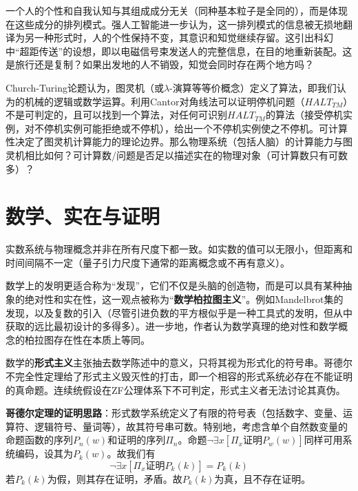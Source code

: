 \par 一个人的个性和自我认知与其组成成分无关（同种基本粒子是全同的），而是体现在这些成分的排列模式。强人工智能进一步认为，这一排列模式的信息被无损地翻译为另一种形式时，人的个性保持不变，其意识和知觉继续存留。这引出科幻中“超距传送”的设想，即以电磁信号束发送人的完整信息，在目的地重新装配。这是旅行还是复制？如果出发地的人不销毁，知觉会同时存在两个地方吗？

\par Church-Turing论题认为，图灵机（或$\lambda$-演算等等价概念）定义了算法，即我们认为的机械的逻辑或数学运算。利用Cantor对角线法可以证明停机问题（$HALT_{TM}$）不是可判定的，且可以找到一个算法，对任何可识别$HALT_{TM}$的算法（接受停机实例，对不停机实例可能拒绝或不停机），给出一个不停机实例使之不停机。可计算性决定了图灵机计算能力的理论边界。那么物理系统（包括人脑）的计算能力与图灵机相比如何？可计算数/问题是否足以描述实在的物理对象（可计算数只有可数多）？

\section{数学、实在与证明}
\par 实数系统与物理概念并非在所有尺度下都一致。如实数的值可以无限小，但距离和时间间隔不一定（量子引力尺度下通常的距离概念或不再有意义）。

\par 数学上的发明更适合称为``发现''，它们不仅是头脑的创造物，而是可以具有某种抽象的绝对性和实在性，这一观点被称为``\textbf{数学柏拉图主义}''。例如Mandelbrot集的发现，以及复数的引入（尽管引进负数的平方根似乎是一种工具式的发明，但从中获取的远比最初设计的多得多）。进一步地，作者认为数学真理的绝对性和数学概念的柏拉图存在性在本质上等同。

\par 数学的\textbf{形式主义}主张抽去数学陈述中的意义，只将其视为形式化的符号串。哥德尔不完全性定理给了形式主义毁灭性的打击，即一个相容的形式系统必存在不能证明的真命题。连续统假设在ZF公理体系下不可判定，形式主义者无法讨论其真伪。

\par \textbf{哥德尔定理的证明思路}：形式数学系统定义了有限的符号表（包括数字、变量、运算符、逻辑符号、量词等），故其符号串可数。特别地，考虑含单个自然数变量的命题函数的序列$P_n(w)$和证明的序列$\Pi_n$。命题$\lnot \exists x [\Pi_x \text{证明} P_w(w)]$同样可用系统编码，设其为$P_k(w)$。故我们有
\begin{displaymath}
\lnot \exists x [\Pi_x \text{证明} P_k(k)]=P_k(k)
\end{displaymath}
若$P_k(k)$为假，则其存在证明，矛盾。故$P_k(k)$为真，且不存在证明。

